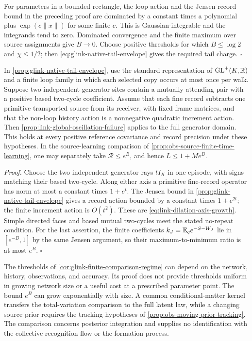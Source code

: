 For parameters in a bounded rectangle, the loop action and the Jensen record
bound in the preceding proof are dominated by a constant times a polynomial
plus $\exp(c\|x\|)$ for some finite $c$. This is Gaussian-integrable and the
integrands tend to zero. Dominated convergence and the finite maximum over
source assignments give $B\to0$. Choose positive thresholds for which
$B\le\log2$ and $\chi\le1/2$; then
\cref{eq:glink-native-tail-envelope} gives the required tail charge. $\square$

In \cref{prop:glink-native-tail-envelope}, use the standard representation of
$\mathrm{GL}^+(K,\mathbb R)$ and a finite loop family in which each selected copy occurs at
most once per walk. Suppose two independent generator sites contain a
mutually attending pair with a positive based two-cycle coefficient. Assume
that each fine record subtracts one primitive transported source from its
receiver, with fixed frame matrices, and that the non-loop history action is
a nonnegative quadratic increment action. Then
\cref{prop:link-global-oscillation-failure} applies to the full generator
domain. This holds at every positive reference covariance and record
precision under these hypotheses. In the source-learning comparison of
\cref{prop:obs-source-finite-time-learning}, one may separately take
$\mathcal R\le e^B$, and hence $L\le1+M e^B$.

\noindent\emph{Proof.}
Choose the two independent generator rays $tI_K$ in one episode, with signs
matching their based two-cycle. Along either axis a primitive fine-record
operator has norm at most a constant times $1+e^t$. The Jensen bound in
\cref{prop:glink-native-tail-envelope} gives a record action bounded by a
constant times $1+e^{2t}$; the finite increment action is $O(t^2)$.
These are \cref{eq:link-dilation-axis-growth}. Simple directed faces and
based mutual two-cycles meet the stated no-repeat condition. For the last
assertion, the finite coefficients
$k_J=\mathbb E_q e^{-S-W_J}$ lie in $[e^{-B},1]$ by the same Jensen argument,
so their maximum-to-minimum ratio is at most $e^B$. $\square$

The thresholds of \cref{cor:glink-finite-comparison-regime} can depend on the
network, history, observations, and accuracy. Its proof does not provide
thresholds uniform in growing network size or a useful cost at a prescribed
parameter point. The bound $e^B$ can grow exponentially with size. A common
conditional-matter kernel transfers the total-variation comparison to the full
latent law, while a changing source prior requires the tracking hypotheses of
\cref{prop:obs-moving-prior-tracking}. The comparison concerns posterior
integration and supplies no identification with the collective recognition
flow or the formation process. 

